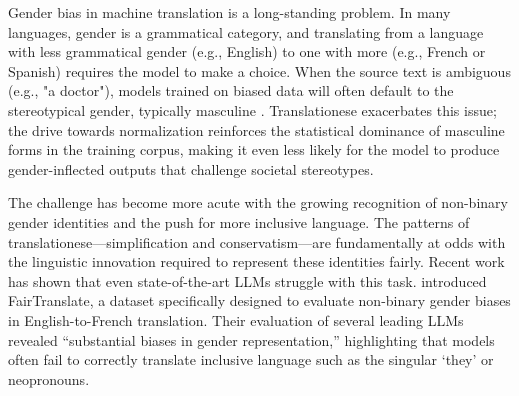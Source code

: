 \documentclass[11pt,a4paper]{article}
\begin{document}
Gender bias in machine translation is a long-standing problem. In many languages, gender is a grammatical category, and translating from a language with less grammatical gender (e.g., English) to one with more (e.g., French or Spanish) requires the model to make a choice. When the source text is ambiguous (e.g., "a doctor"), models trained on biased data will often default to the stereotypical gender, typically masculine \cite{vanmassenhove2018getting}. Translationese exacerbates this issue; the drive towards normalization reinforces the statistical dominance of masculine forms in the training corpus, making it even less likely for the model to produce gender-inflected outputs that challenge societal stereotypes.

The challenge has become more acute with the growing recognition of non-binary gender identities and the push for more inclusive language. The patterns of translationese---simplification and conservatism---are fundamentally at odds with the linguistic innovation required to represent these identities fairly. Recent work has shown that even state-of-the-art LLMs struggle with this task. \citet{jourdan2025fairtranslate} introduced FairTranslate, a dataset specifically designed to evaluate non-binary gender biases in English-to-French translation. Their evaluation of several leading LLMs revealed ``substantial biases in gender representation,'' highlighting that models often fail to correctly translate inclusive language such as the singular `they' or neopronouns.
\end{document}
